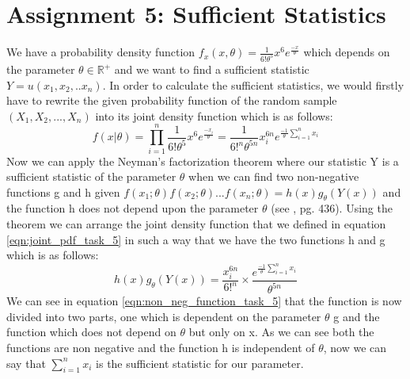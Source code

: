 \chapter{Assignment 5: Sufficient Statistics}
We have a probability density function $f_x(x,\theta) = \frac{1}{6! \theta^5}x^6e^{\frac{-x}{\theta}}$ which depends on the parameter $\theta \in \mathbb{R}^+$ and we want to find a sufficient statistic $Y=u(x_1, x_2,..x_n)$. In order to calculate the sufficient statistics, we would firstly have to rewrite the given probability function of the random sample $(X_1, X_2, ..., X_n)$ into its joint density function which is as follows:
\begin{equation} \label{eqn:joint_pdf_task_5}
        f(x|\theta) = \prod_{i=1}^{n} \frac{1}{6! \theta^5}x^6e^{\frac{-x_i}{\theta}} = \frac{1}{6!^n \theta^{5n}}x_i^{6n}e^{\frac{-1}{\theta} \sum_{i=1}^{n}x_i} 
\end{equation}
Now we can apply the Neyman's factorization theorem where our statistic Y is a sufficient statistic of the parameter $\theta$ when we can find two non-negative functions g and h given $f(x_1;\theta)f(x_2;\theta)...f(x_n;\theta)=h(x) g_{\theta}(Y(x))$ and the function h does not depend upon the parameter $\theta$ (see \cite{hogg:2005}, pg. 436). Using the theorem we can arrange the joint density function that we defined in equation \ref{eqn:joint_pdf_task_5} in such a way that we have the two functions h and g which is as follows:
\begin{equation} \label{eqn:non_neg_function_task_5}
   h(x) g_{\theta}(Y(x)) = \frac{x_i^{6n}}{6!^n} \times \frac{e^{\frac{-1}{\theta} \sum_{i=1}^{n}x_i}}{\theta^{5n}} 
\end{equation}\newline\newline
We can see in equation \ref{eqn:non_neg_function_task_5} that the function is now divided into two parts, one which is dependent on the parameter $\theta$ g and the function which does not depend on $\theta$ but only on x. As we can see both the functions are non negative and the function h is independent of $\theta$, now we can say that $\sum_{i=1}^{n}x_i$ is the sufficient statistic for our parameter. 